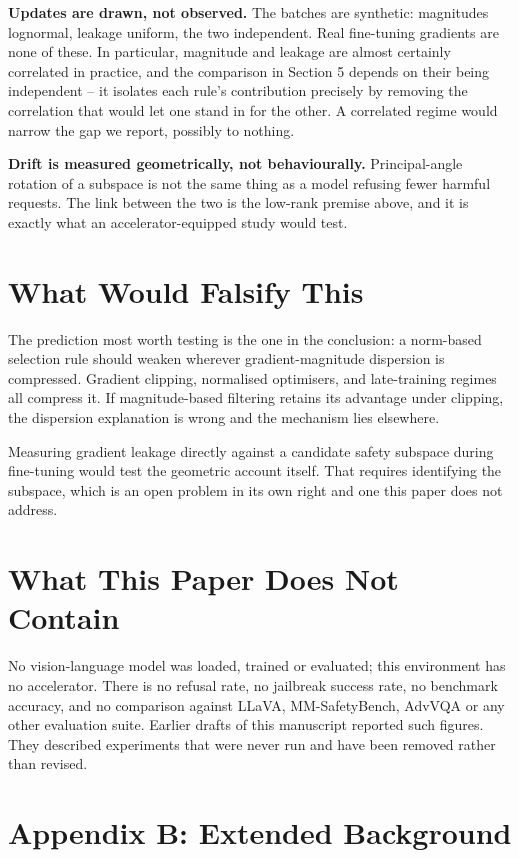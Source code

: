 \documentclass[10pt,twocolumn,letterpaper]{article}
\begin{document}
\textbf{Updates are drawn, not observed.} The batches are synthetic: magnitudes lognormal, leakage uniform, the two independent. Real fine-tuning gradients are none of these. In particular, magnitude and leakage are almost certainly correlated in practice, and the comparison in Section 5 depends on their being independent -- it isolates each rule's contribution precisely by removing the correlation that would let one stand in for the other. A correlated regime would narrow the gap we report, possibly to nothing.

\textbf{Drift is measured geometrically, not behaviourally.} Principal-angle rotation of a subspace is not the same thing as a model refusing fewer harmful requests. The link between the two is the low-rank premise above, and it is exactly what an accelerator-equipped study would test.


\section{What Would Falsify This}


The prediction most worth testing is the one in the conclusion: a norm-based selection rule should weaken wherever gradient-magnitude dispersion is compressed. Gradient clipping, normalised optimisers, and late-training regimes all compress it. If magnitude-based filtering retains its advantage under clipping, the dispersion explanation is wrong and the mechanism lies elsewhere.

Measuring gradient leakage directly against a candidate safety subspace during fine-tuning would test the geometric account itself. That requires identifying the subspace, which is an open problem in its own right and one this paper does not address.


\section{What This Paper Does Not Contain}


No vision-language model was loaded, trained or evaluated; this environment has no accelerator. There is no refusal rate, no jailbreak success rate, no benchmark accuracy, and no comparison against LLaVA, MM-SafetyBench, AdvVQA or any other evaluation suite. Earlier drafts of this manuscript reported such figures. They described experiments that were never run and have been removed rather than revised.




\section{Appendix B: Extended Background}
\end{document}
